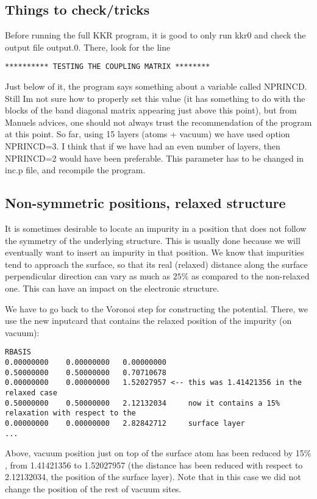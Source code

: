 \documentclass[11pt,fleqn]{book} %
\begin{document}
\subsection{Things to check/tricks}
Before running the full KKR program, it is good to only run
kkr0 and check the output file output.0. There, look for the line
\begin{VBox}
\begin{verbatim}
********** TESTING THE COUPLING MATRIX ********
\end{verbatim}
\end{VBox}
Just below of it, the program says something about a variable called
NPRINCD. Still Im not sure how to properly set this value
(it has something to do with the blocks of the band diagonal matrix appearing
just above this point), but from Manuels
advices, one should not always trust the recommendation of the program at this point.
So far, using 15 layers (atoms + vacuum) we have used option NPRINCD=3.
I think that if we have had an even number of layers, then NPRINCD=2 would have been preferable.
This parameter has to be changed in inc.p file, and recompile the program.

\subsection{Non-symmetric positions, relaxed structure}

It is sometimes desirable to locate an impurity in a position
that does not follow the symmetry of the underlying structure.
This is usually done because we will eventually want to insert an impurity
in that position. We know that impurities tend to approach the surface,
so that its real (relaxed) distance along the surface perpendicular direction
can vary as much as $25\%$ as compared to the non-relaxed one. This can have an impact on
the electronic structure.

We have to go back to the Voronoi step for constructing the potential.
There, we use the new inputcard that contains the relaxed position of the impurity (on vacuum):
\begin{VBox}
\begin{verbatim}
RBASIS
0.00000000    0.00000000   0.00000000
0.50000000    0.50000000   0.70710678
0.00000000    0.00000000   1.52027957 <-- this was 1.41421356 in the relaxed case
0.50000000    0.50000000   2.12132034     now it contains a 15% relaxation with respect to the
0.00000000    0.00000000   2.82842712     surface layer
...
\end{verbatim}
\end{VBox}
Above, vacuum position just on top of the surface atom
has been reduced by 15$\%$, from 1.41421356 to 1.52027957
(the distance has been reduced with respect to 2.12132034, the position
of the surface layer).
Note that in this case we did not change the position of the rest
of vacuum sites.
\end{document}
